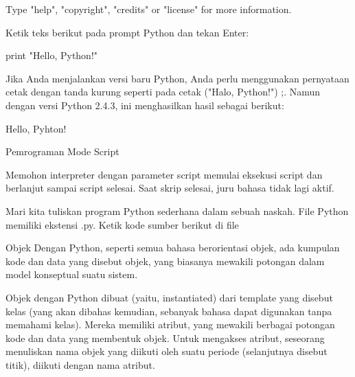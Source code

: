 \noindent 
{\fontsize{14pt}{14pt}\selectfont Type "help", "copyright", "credits" or "license" for more information. \\} \par
\vspace{14pt}
\noindent 
{\fontsize{14pt}{14pt}\selectfont Ketik teks berikut pada prompt Python dan tekan Enter: \\} \par
\vspace{14pt}
\noindent 
{\fontsize{14pt}{14pt}\selectfont print "Hello, Python!" \\} \par
\vspace{14pt}
\noindent 
{\fontsize{14pt}{14pt}\selectfont Jika Anda menjalankan versi baru Python, Anda perlu menggunakan pernyataan cetak dengan tanda kurung seperti pada cetak ("Halo, Python!") ;. Namun dengan versi Python 2.4.3, ini menghasilkan hasil sebagai berikut: \\} \par
\vspace{14pt}
\noindent 
{\fontsize{14pt}{14pt}\selectfont Hello, Pyhton! \\} \par
\vspace{14pt}
\noindent 
{\fontsize{14pt}{14pt}\selectfont Pemrograman Mode Script \\} \par
\noindent 
{\fontsize{14pt}{14pt}\selectfont Memohon interpreter dengan parameter script memulai eksekusi script dan berlanjut sampai script selesai. Saat skrip selesai, juru bahasa tidak lagi aktif. \\} \par
\vspace{14pt}
\noindent 
{\fontsize{14pt}{14pt}\selectfont Mari kita tuliskan program Python sederhana dalam sebuah naskah. File Python memiliki ekstensi .py. Ketik kode sumber berikut di file \\} \par
\vspace{14pt}
\noindent 
{\fontsize{14pt}{14pt}\selectfont Objek Dengan Python, seperti semua bahasa berorientasi objek, ada kumpulan kode dan data yang disebut objek, yang biasanya mewakili potongan dalam model konseptual suatu sistem. \\} \par
\vspace{14pt}
\noindent 
{\fontsize{14pt}{14pt}\selectfont Objek dengan Python dibuat (yaitu, instantiated) dari template yang disebut kelas (yang akan dibahas kemudian, sebanyak bahasa dapat digunakan tanpa memahami kelas). Mereka memiliki atribut, yang mewakili berbagai potongan kode dan data yang membentuk objek. Untuk mengakses atribut, seseorang menuliskan nama objek yang diikuti oleh suatu periode (selanjutnya disebut titik), diikuti dengan nama atribut. \\} \par
